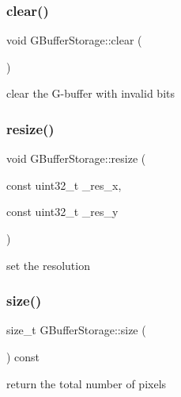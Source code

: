 \subsubsection{\texorpdfstring{clear()}{clear()}}
{\footnotesize\ttfamily void G\+Buffer\+Storage\+::clear (\begin{DoxyParamCaption}{ }\end{DoxyParamCaption})\hspace{0.3cm}{\ttfamily [inline]}}

clear the G-\/buffer with invalid bits \mbox{\label{struct_g_buffer_storage_a4c56dec448dc48418f8e4dd47adc8e44}} 
\subsubsection{\texorpdfstring{resize()}{resize()}}
{\footnotesize\ttfamily void G\+Buffer\+Storage\+::resize (\begin{DoxyParamCaption}\item[{const uint32\+\_\+t}]{\+\_\+res\+\_\+x,  }\item[{const uint32\+\_\+t}]{\+\_\+res\+\_\+y }\end{DoxyParamCaption})\hspace{0.3cm}{\ttfamily [inline]}}

set the resolution \mbox{\label{struct_g_buffer_storage_ad9fd298041c1d4f7b239c0242a8f8b5f}} 
\subsubsection{\texorpdfstring{size()}{size()}}
{\footnotesize\ttfamily size\+\_\+t G\+Buffer\+Storage\+::size (\begin{DoxyParamCaption}{ }\end{DoxyParamCaption}) const\hspace{0.3cm}{\ttfamily [inline]}}

return the total number of pixels \mbox{\label{struct_g_buffer_storage_ade6d37a2dba46fe7b701634fe97fb7b9}} 
